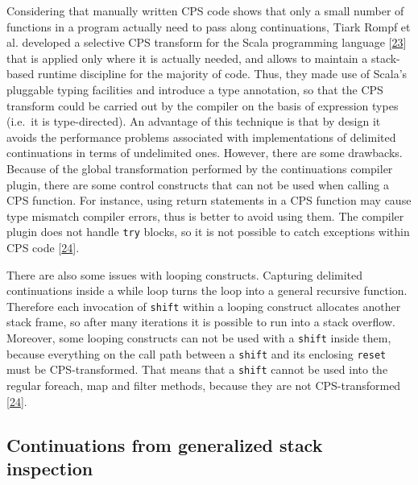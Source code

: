 \documentclass[12pt,a4paper,oneside,openright]{book}
\begin{document}
Considering that manually written CPS code shows that only a small
number of functions in a program actually need to pass along
continuations, Tiark Rompf et al. developed a selective CPS transform
for the Scala programming language {[}\hyperref[ref-Rompf2009]{23}{]}
that is applied only where it is actually needed, and allows to maintain
a stack-based runtime discipline for the majority of code. Thus, they
made use of Scala's pluggable typing facilities and introduce a type
annotation, so that the CPS transform could be carried out by the
compiler on the basis of expression types (i.e.~it is type-directed). An
advantage of this technique is that by design it avoids the performance
problems associated with implementations of delimited continuations in
terms of undelimited ones. However, there are some drawbacks. Because of
the global transformation performed by the continuations compiler
plugin, there are some control constructs that can not be used when
calling a CPS function. For instance, using return statements in a CPS
function may cause type mismatch compiler errors, thus is better to
avoid using them. The compiler plugin does not handle \texttt{try}
blocks, so it is not possible to catch exceptions within CPS code
{[}\hyperref[ref-McBeath2010]{24}{]}.

There are also some issues with looping constructs. Capturing delimited
continuations inside a while loop turns the loop into a general
recursive function. Therefore each invocation of \texttt{shift} within a
looping construct allocates another stack frame, so after many
iterations it is possible to run into a stack overflow. Moreover, some
looping constructs can not be used with a \texttt{shift} inside them,
because everything on the call path between a \texttt{shift} and its
enclosing \texttt{reset} must be CPS-transformed. That means that a
\texttt{shift} cannot be used into the regular foreach, map and filter
methods, because they are not CPS-transformed
{[}\hyperref[ref-McBeath2010]{24}{]}.

\subsection{Continuations from generalized stack
inspection}\label{continuations-from-generalized-stack-inspection}
\end{document}
